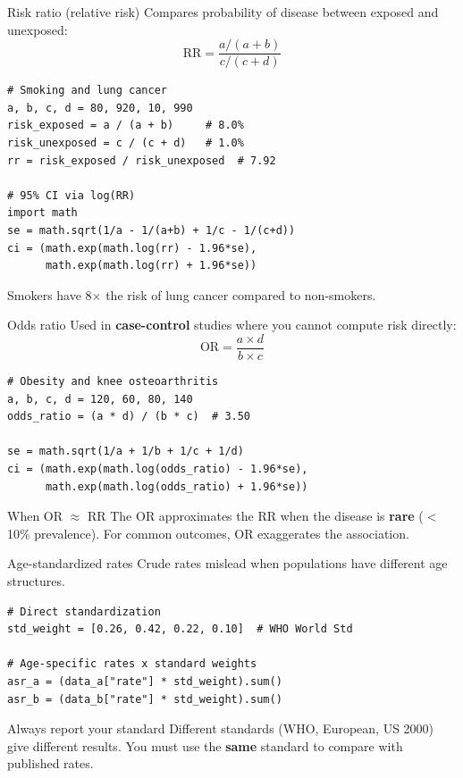 \documentclass[aspectratio=169,11pt]{beamer}
\begin{document}
\begin{frame}[fragile]{Risk ratio (relative risk)}
Compares probability of disease between exposed and unexposed:
$$\text{RR} = \frac{a/(a+b)}{c/(c+d)}$$

\begin{verbatim}
# Smoking and lung cancer
a, b, c, d = 80, 920, 10, 990
risk_exposed = a / (a + b)     # 8.0%
risk_unexposed = c / (c + d)   # 1.0%
rr = risk_exposed / risk_unexposed  # 7.92

# 95% CI via log(RR)
import math
se = math.sqrt(1/a - 1/(a+b) + 1/c - 1/(c+d))
ci = (math.exp(math.log(rr) - 1.96*se),
      math.exp(math.log(rr) + 1.96*se))
\end{verbatim}

Smokers have \alert{8$\times$ the risk} of lung cancer compared to non-smokers.
\end{frame}

\begin{frame}[fragile]{Odds ratio}
Used in \textbf{case-control} studies where you cannot compute risk directly:
$$\text{OR} = \frac{a \times d}{b \times c}$$

\begin{verbatim}
# Obesity and knee osteoarthritis
a, b, c, d = 120, 60, 80, 140
odds_ratio = (a * d) / (b * c)  # 3.50

se = math.sqrt(1/a + 1/b + 1/c + 1/d)
ci = (math.exp(math.log(odds_ratio) - 1.96*se),
      math.exp(math.log(odds_ratio) + 1.96*se))
\end{verbatim}

\vspace{4pt}
\begin{exampleblock}{When OR $\approx$ RR}
The OR approximates the RR when the disease is \textbf{rare} ($<$10\% prevalence). For common outcomes, OR exaggerates the association.
\end{exampleblock}
\end{frame}

\begin{frame}[fragile]{Age-standardized rates}
Crude rates mislead when populations have different age structures.

\begin{verbatim}
# Direct standardization
std_weight = [0.26, 0.42, 0.22, 0.10]  # WHO World Std

# Age-specific rates x standard weights
asr_a = (data_a["rate"] * std_weight).sum()
asr_b = (data_b["rate"] * std_weight).sum()
\end{verbatim}

\vspace{4pt}
\begin{alertblock}{Always report your standard}
Different standards (WHO, European, US 2000) give different results. You must use the \textbf{same} standard to compare with published rates.
\end{alertblock}
\end{frame}
\end{document}
